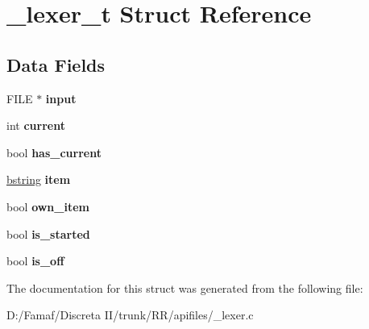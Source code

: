\hypertarget{struct__lexer__t}{\section{\+\_\+lexer\+\_\+t Struct Reference}
\label{struct__lexer__t}
}
\subsection*{Data Fields}
\begin{DoxyCompactItemize}
\item 
\hypertarget{struct__lexer__t_abfae665d56d61e1c21831bec369abd34}{F\+I\+L\+E $\ast$ {\bfseries input}}\label{struct__lexer__t_abfae665d56d61e1c21831bec369abd34}

\item 
\hypertarget{struct__lexer__t_ab04e2d55ea4a544f3575812582af7b51}{int {\bfseries current}}\label{struct__lexer__t_ab04e2d55ea4a544f3575812582af7b51}

\item 
\hypertarget{struct__lexer__t_a849ff3334b6f77aa2862003ca39103fe}{bool {\bfseries has\+\_\+current}}\label{struct__lexer__t_a849ff3334b6f77aa2862003ca39103fe}

\item 
\hypertarget{struct__lexer__t_ab826cc29e39301e5c610eb5c04b5308c}{\hyperlink{structtagbstring}{bstring} {\bfseries item}}\label{struct__lexer__t_ab826cc29e39301e5c610eb5c04b5308c}

\item 
\hypertarget{struct__lexer__t_af07abc05ef1b96a95f29b4551006af48}{bool {\bfseries own\+\_\+item}}\label{struct__lexer__t_af07abc05ef1b96a95f29b4551006af48}

\item 
\hypertarget{struct__lexer__t_a4f8b893603bd3b5d0bd0d6378f07976c}{bool {\bfseries is\+\_\+started}}\label{struct__lexer__t_a4f8b893603bd3b5d0bd0d6378f07976c}

\item 
\hypertarget{struct__lexer__t_ad06bfb60b8c161a565a740f59c8ed846}{bool {\bfseries is\+\_\+off}}\label{struct__lexer__t_ad06bfb60b8c161a565a740f59c8ed846}

\end{DoxyCompactItemize}


The documentation for this struct was generated from the following file\+:\begin{DoxyCompactItemize}
\item 
D\+:/\+Famaf/\+Discreta I\+I/trunk/\+R\+R/apifiles/\+\_\+lexer.\+c\end{DoxyCompactItemize}
